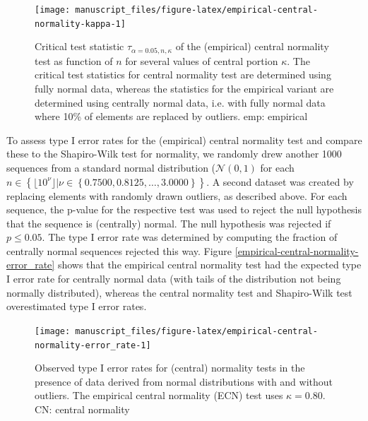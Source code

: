 \documentclass[
  a4paper,
]{article}
\begin{document}
\begin{figure}

{\centering \texttt{[image: manuscript\_files/figure-latex/empirical-central-normality-kappa-1]} 

}

\caption{Critical test statistic $\tau_{\alpha = 0.05, n, \kappa}$ of the (empirical) central normality test as function of $n$ for several values of central portion $\kappa$. The critical test statistics for central normality test are determined using fully normal data, whereas the statistics for the empirical variant are determined using centrally normal data, i.e. with fully normal data where 10\% of elements are replaced by outliers. emp: empirical}\label{fig:empirical-central-normality-kappa}
\end{figure}

To assess type I error rates for the (empirical) central normality test
and compare these to the Shapiro-Wilk test for normality, we randomly
drew another 1000 sequences from a standard normal distribution
(\(\mathcal{N}(0,1)\) for each
\(n \in \left\{\lfloor 10^\nu \rfloor | \nu \in \left\{0.7500, 0.8125, \ldots, 3.0000 \right \} \right\}\).
A second dataset was created by replacing elements with randomly drawn
outliers, as described above. For each sequence, the p-value for the
respective test was used to reject the null hypothesis that the sequence
is (centrally) normal. The null hypothesis was rejected if
\(p \leq 0.05\). The type I error rate was determined by computing the
fraction of centrally normal sequences rejected this way. Figure
\ref{empirical-central-normality-error_rate} shows that the empirical
central normality test had the expected type I error rate for centrally
normal data (with tails of the distribution not being normally
distributed), whereas the central normality test and Shapiro-Wilk test
overestimated type I error rates.

\begin{figure}

{\centering \texttt{[image: manuscript\_files/figure-latex/empirical-central-normality-error\_rate-1]} 

}

\caption{Observed type I error rates for (central) normality tests in the presence of data derived from normal distributions with and without outliers. The empirical central normality (ECN) test uses $\kappa = 0.80$. CN: central normality}\label{fig:empirical-central-normality-error_rate}
\end{figure}
\end{document}
